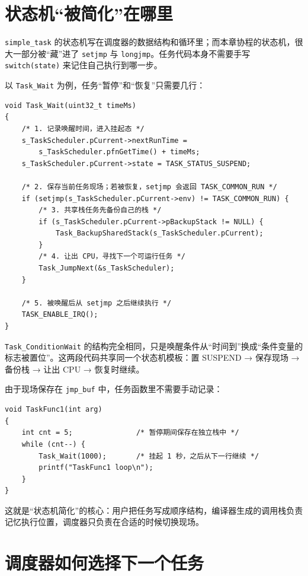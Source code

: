 \section{状态机“被简化”在哪里}

\texttt{simple\_task} 的状态机写在调度器的数据结构和循环里；而本章协程的状态机，很大一部分被“藏”进了 \texttt{setjmp} 与 \texttt{longjmp}。任务代码本身不需要手写 \texttt{switch(state)} 来记住自己执行到哪一步。

以 \texttt{Task\_Wait} 为例，任务“暂停”和“恢复”只需要几行：

\begin{lstlisting}[style=c]
void Task_Wait(uint32_t timeMs)
{
    /* 1. 记录唤醒时间，进入挂起态 */
    s_TaskScheduler.pCurrent->nextRunTime =
        s_TaskScheduler.pfnGetTime() + timeMs;
    s_TaskScheduler.pCurrent->state = TASK_STATUS_SUSPEND;

    /* 2. 保存当前任务现场；若被恢复，setjmp 会返回 TASK_COMMON_RUN */
    if (setjmp(s_TaskScheduler.pCurrent->env) != TASK_COMMON_RUN) {
        /* 3. 共享栈任务先备份自己的栈 */
        if (s_TaskScheduler.pCurrent->pBackupStack != NULL) {
            Task_BackupSharedStack(s_TaskScheduler.pCurrent);
        }
        /* 4. 让出 CPU，寻找下一个可运行任务 */
        Task_JumpNext(&s_TaskScheduler);
    }

    /* 5. 被唤醒后从 setjmp 之后继续执行 */
    TASK_ENABLE_IRQ();
}
\end{lstlisting}

\texttt{Task\_ConditionWait} 的结构完全相同，只是唤醒条件从“时间到”换成“条件变量的标志被置位”。这两段代码共享同一个状态机模板：置 SUSPEND → 保存现场 → 备份栈 → 让出 CPU → 恢复时继续。

由于现场保存在 \texttt{jmp\_buf} 中，任务函数里不需要手动记录：

\begin{lstlisting}[style=c]
void TaskFunc1(int arg)
{
    int cnt = 5;               /* 暂停期间保存在独立栈中 */
    while (cnt--) {
        Task_Wait(1000);       /* 挂起 1 秒，之后从下一行继续 */
        printf("TaskFunc1 loop\n");
    }
}
\end{lstlisting}

这就是“状态机简化”的核心：用户把任务写成顺序结构，编译器生成的调用栈负责记忆执行位置，调度器只负责在合适的时候切换现场。

\section{调度器如何选择下一个任务}

